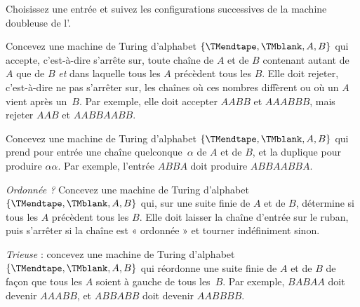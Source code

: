 \documentclass[../../../include/open-logic-section]{subfiles}
\begin{document}
\begin{prob}
Choisissez une entrée et suivez les configurations
successives de la machine doubleuse de l'.
\end{prob}

\begin{prob}
Concevez une machine de Turing d'alphabet
$\{\TMendtape,\TMblank,A,B\}$ qui accepte,
c'est-à-dire s'arrête sur, toute chaîne de $A$
et de $B$ contenant autant de $A$ que de $B$
\emph{et} dans laquelle tous les $A$ précèdent
tous les $B$. Elle doit rejeter, c'est-à-dire
ne pas s'arrêter sur, les chaînes où ces nombres
diffèrent ou où un $A$ vient après un~$B$.
Par exemple, elle doit accepter $AABB$ et $AAABBB$,
mais rejeter $AAB$ et $AABBAABB$.
\end{prob}

\begin{prob}
Concevez une machine de Turing d'alphabet
$\{\TMendtape,\TMblank,A,B\}$ qui prend pour
entrée une chaîne quelconque~$\alpha$ de $A$
et de $B$, et la duplique pour produire
$\alpha\alpha$. Par exemple, l'entrée $ABBA$
doit produire $ABBAABBA$.
\end{prob}

\begin{prob}
\emph{Ordonnée ?} Concevez une machine de Turing
d'alphabet $\{\TMendtape,\TMblank,A,B\}$ qui,
sur une suite finie de $A$ et de $B$, détermine
si tous les $A$ précèdent tous les $B$. Elle
doit laisser la chaîne d'entrée sur le ruban,
puis s'arrêter si la chaîne est « ordonnée »
et tourner indéfiniment sinon.
\end{prob}

\begin{prob}
\emph{Trieuse} : concevez une machine de Turing
d'alphabet $\{\TMendtape,\TMblank,A,B\}$ qui
réordonne une suite finie de $A$ et de $B$ de
façon que tous les $A$ soient à gauche de tous
les~$B$. Par exemple, $BABAA$ doit devenir
$AAABB$, et $ABBABB$ doit devenir $AABBBB$.
\end{prob}
\end{document}
